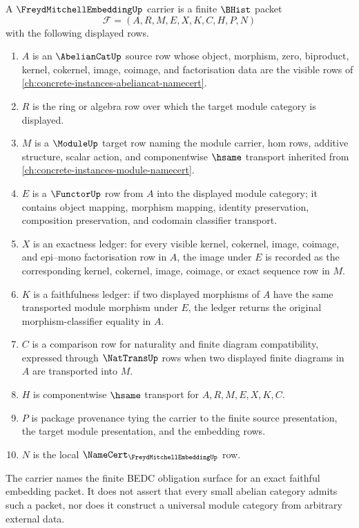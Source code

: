 \begin{definition}
\label{def:freyd-mitchell-embedding-carrier}
A $\FreydMitchellEmbeddingUp$ carrier is a finite $\BHist$ packet
$$
\mathcal F=(A,R,M,E,X,K,C,H,P,N)
$$
with the following displayed rows.
\begin{enumerate}
  \item $A$ is an $\AbelianCatUp$ source row whose object, morphism, zero, biproduct, kernel, cokernel, image, coimage, and factorisation data are the visible rows of \autoref{ch:concrete-instances-abeliancat-namecert}.
  \item $R$ is the ring or algebra row over which the target module category is displayed.
  \item $M$ is a $\ModuleUp$ target row naming the module carrier, hom rows, additive structure, scalar action, and componentwise $\hsame$ transport inherited from \autoref{ch:concrete-instances-module-namecert}.
  \item $E$ is a $\FunctorUp$ row from $A$ into the displayed module category; it contains object mapping, morphism mapping, identity preservation, composition preservation, and codomain classifier transport.
  \item $X$ is an exactness ledger: for every visible kernel, cokernel, image, coimage, and epi--mono factorisation row in $A$, the image under $E$ is recorded as the corresponding kernel, cokernel, image, coimage, or exact sequence row in $M$.
  \item $K$ is a faithfulness ledger: if two displayed morphisms of $A$ have the same transported module morphism under $E$, the ledger returns the original morphism-classifier equality in $A$.
  \item $C$ is a comparison row for naturality and finite diagram compatibility, expressed through $\NatTransUp$ rows when two displayed finite diagrams in $A$ are transported into $M$.
  \item $H$ is componentwise $\hsame$ transport for $A,R,M,E,X,K,C$.
  \item $P$ is package provenance tying the carrier to the finite source presentation, the target module presentation, and the embedding rows.
  \item $N$ is the local $\NameCert_{\FreydMitchellEmbeddingUp}$ row.
\end{enumerate}
The carrier names the finite BEDC obligation surface for an exact faithful embedding packet. It does not assert that every small abelian category admits such a packet, nor does it construct a universal module category from arbitrary external data.
\end{definition}

